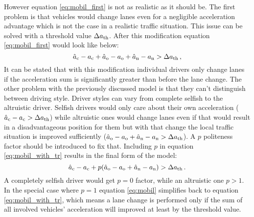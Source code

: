 			However equation \ref{eq:mobil_first} is not as realistic as it should be. The first problem is that vehicles would change lanes  even for a negligible acceleration advantage which is not the case in a realistic traffic situation. This issue can be solved with a threshold value $\Delta  a_{\rm th}$. After this modification equation \ref{eq:mobil_first} would look like below:
			\begin{equation}
				\hat{a}_{\rm c} - a_{\rm c} + \hat{a}_{\rm o} - a_{\rm o} + \hat{a}_{\rm n} - a_{\rm n} > \Delta  a_{\rm th}\,,
				\label{eq:mobil_with_tr}
			\end{equation}
			It can be stated that with this modification individual drivers only change lanes if the acceleration sum is significantly greater than before the lane change. The other problem with the previously discussed model is that they can't distinguish between driving style. Driver styles can vary from complete selfish to the altruistic driver. Selfish drivers would only care about  their own acceleration ($\hat{a}_{\rm c} - a_{\rm c} > \Delta  a_{\rm th}$) while altruistic ones would change lanes even if that would result in a disadvantageous position for them but with that change the local traffic situation is improved sufficiently ($\hat{a}_{\rm o} - a_{\rm o} + \hat{a}_{\rm n} - a_{\rm n} > \Delta  a_{\rm th}$). A $p$ politeness factor should be introduced to fix that. Including $p$ in equation \ref{eq:mobil_with_tr} results in the final form of the model:
			\begin{equation}
				\hat{a}_{\rm c} - a_{\rm c} + p(\hat{a}_{\rm o} - a_{\rm o} + \hat{a}_{\rm n} - a_{\rm n}) > \Delta  a_{\rm th}\,.
				\label{eq:mobil}
			\end{equation}
			A completely selfish driver would get $p=0$ factor, while an altruistic one $p>1$. In the special case where $p=1$ equation \ref{eq:mobil} simplifies back to equation \ref{eq:mobil_with_tr}, which means a lane change is performed only if the sum of all involved vehicles' acceleration will improved at least by the threshold value.

